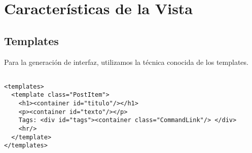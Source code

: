 %
%
%
%
%
%


\section{Características de la Vista}

\subsection{Templates}
\label{sub-templates}
Para la generación de interfaz, utilizamos la técnica conocida de los templates.

\begin{verbatim}

<templates>
  <template class="PostItem">
    <h1><container id="titulo"/></h1>
    <p><container id="texto"/></p>
    Tags: <div id="tags"><container class="CommandLink"/> </div>
    <hr/>
  </template>
</templates>

\end{verbatim}

